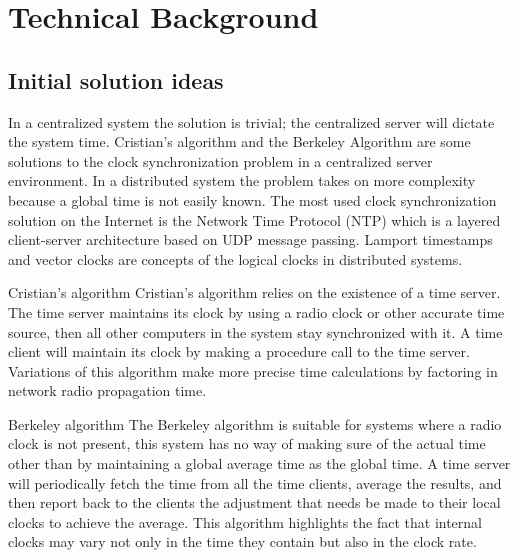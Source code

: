 \chapter{Technical Background}
\label{chap:technical}
%
%
%

\section{Initial solution ideas}
In a centralized system the solution is trivial; the centralized server will dictate the system time. Cristian's algorithm and the Berkeley Algorithm are some solutions to the clock synchronization problem in a centralized server environment. In a distributed system the problem takes on more complexity because a global time is not easily known. The most used clock synchronization solution on the Internet is the Network Time Protocol (NTP) which is a layered client-server architecture based on UDP message passing. Lamport timestamps and vector clocks are concepts of the logical clocks in distributed systems.

Cristian's algorithm
Cristian's algorithm relies on the existence of a time server. The time
server maintains its clock by using a radio clock or other accurate time source,
then all other computers in the system stay synchronized with it. A time client
will maintain its clock by making a procedure call to the time server. Variations
of this algorithm make more precise time calculations by factoring in network radio
propagation time.

Berkeley algorithm
The Berkeley algorithm is suitable for systems where a radio clock is not present,
this system has no way of making sure of the actual time other than by maintaining
a global average time as the global time. A time server will periodically fetch
the time from all the time clients, average the results, and then report back to
the clients the adjustment that needs be made to their local clocks to achieve
the average. This algorithm highlights the fact that internal clocks may vary
not only in the time they contain but also in the clock rate.

